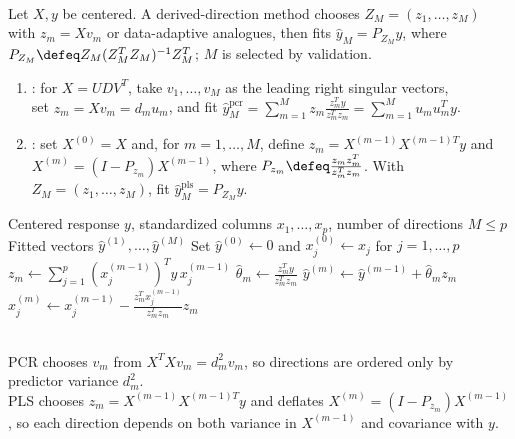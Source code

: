 \begin{method} \label{meth:sl-derived-input-directions} \\
Let $X,y$ be centered. A derived-direction method chooses $Z_M=(z_1,\ldots,z_M)$ with $z_m=Xv_m$ or data-adaptive analogues, then fits $\widehat{y}_M=P_{Z_M}y$, where $P_{Z_M}\defeq Z_M(Z_M^TZ_M)^{-1}Z_M^T$; $M$ is selected by validation.
\begin{enumerate}[label=(\roman*)]
\setlength{\itemsep}{0pt}
\item {}: for $X=UDV^T$, take $v_1,\ldots,v_M$ as the leading right singular vectors,\\
set $z_m=Xv_m=d_mu_m$, and fit $\widehat{y}^{\mathrm{pcr}}_M=\sum\limits_{m=1}^M z_m\frac{z_m^Ty}{z_m^Tz_m}=\sum\limits_{m=1}^M u_mu_m^Ty$.
\item {}: set $X^{(0)}=X$ and, for $m=1,\ldots,M$, define $z_m=X^{(m-1)}X^{(m-1)T}y$ and\\
$X^{(m)}=(I-P_{z_m})X^{(m-1)}$, where $P_{z_m}\defeq \frac{z_mz_m^T}{z_m^Tz_m}$. With $Z_M=(z_1,\ldots,z_M)$, fit $\widehat{y}^{\mathrm{pls}}_M=P_{Z_M}y$.
\end{enumerate}
\end{method}

\begin{breakablealgorithm}
\caption{Partial Least Squares Directions}
\label{alg:sl-partial-least-squares-directions}
\begin{algorithmic}
\Require Centered response $y$, standardized columns $x_1,\ldots,x_p$, number of directions $M\leq p$
\Ensure Fitted vectors $\widehat{y}^{(1)},\ldots,\widehat{y}^{(M)}$
\State Set $\widehat{y}^{(0)}\gets0$ and $x_j^{(0)}\gets x_j$ for $j=1,\ldots,p$
\State $z_m\gets\sum\limits_{j=1}^p (x_j^{(m-1)})^Ty\,x_j^{(m-1)}$
\State $\widehat{\theta}_m\gets \frac{z_m^Ty}{z_m^Tz_m}$
\State $\widehat{y}^{(m)}\gets\widehat{y}^{(m-1)}+\widehat{\theta}_m z_m$
\State $x_j^{(m)}\gets x_j^{(m-1)}-\frac{z_m^Tx_j^{(m-1)}}{z_m^Tz_m}z_m$
\EndFor
\EndFor
\end{algorithmic}
\end{breakablealgorithm}

\begin{remark} \label{rem:sl-pls-pcr-contrast} \\
PCR chooses $v_m$ from $X^TXv_m=d_m^2v_m$, so directions are ordered only by predictor variance $d_m^2$.\\
PLS chooses $z_m=X^{(m-1)}X^{(m-1)T}y$ and deflates $X^{(m)}=(I-P_{z_m})X^{(m-1)}$, so each direction depends on both variance in $X^{(m-1)}$ and covariance with $y$.
\end{remark}

